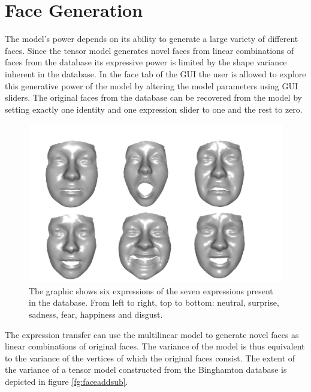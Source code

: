 \documentclass[11pt,a4paper]{report}
\begin{document}
\section{Face Generation}
The model's power depends on its ability to generate a large variety of
different faces. Since the tensor model generates novel faces from linear
combinations of faces from the database its expressive power is limited by the
shape variance inherent in the database. In the face tab of the GUI the user is
allowed to explore this generative power of the model by altering the model
parameters using GUI sliders. The original faces from the database can be
recovered from the model by setting exactly one identity and one expression
slider to one and the rest to zero. 
\begin{figure}[H]
\begin{centering}
\includegraphics[scale=0.25]{images/faces_generated.png}
\par\end{centering}

\caption{The graphic shows six expressions of the seven
  expressions present in the database. From left to
  right, top to bottom: neutral, surprise, sadness, fear, happiness and disgust.}
\label{fg:facegen}
\end{figure}
 
The expression transfer can use the multilinear model to generate novel faces as
linear combinations of original faces. The variance of the model is thus
equivalent to the variance of the vertices of which the original faces consist. The extent of the variance of a tensor model constructed from the Binghamton database is depicted in figure \ref{fg:faceaddsub}.
\end{document}
